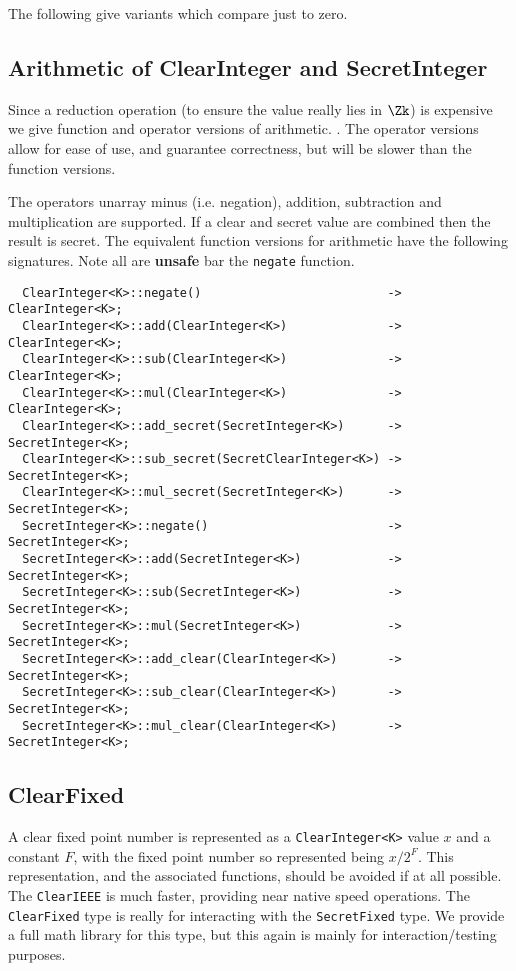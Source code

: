\noindent
The following give variants which compare just to zero.

\subsection{Arithmetic of ClearInteger and SecretInteger}
Since a reduction operation (to ensure the value really lies in
$\Zk$) is expensive we give function and operator versions of arithmetic.
.
The operator versions allow for ease of use, and guarantee correctness,
but will be slower than the function versions.

The operators unarray minus (i.e. negation), addition, subtraction
and multiplication are supported. If a clear and secret value are
combined then the result is secret.
The equivalent function versions for arithmetic have the following signatures.
Note all are {\bf unsafe} bar the \verb|negate| function.
\begin{lstlisting}
  ClearInteger<K>::negate()                          -> ClearInteger<K>;
  ClearInteger<K>::add(ClearInteger<K>)              -> ClearInteger<K>;
  ClearInteger<K>::sub(ClearInteger<K>)              -> ClearInteger<K>;
  ClearInteger<K>::mul(ClearInteger<K>)              -> ClearInteger<K>;
  ClearInteger<K>::add_secret(SecretInteger<K>)      -> SecretInteger<K>;
  ClearInteger<K>::sub_secret(SecretClearInteger<K>) -> SecretInteger<K>;
  ClearInteger<K>::mul_secret(SecretInteger<K>)      -> SecretInteger<K>;
  SecretInteger<K>::negate()                         -> SecretInteger<K>;
  SecretInteger<K>::add(SecretInteger<K>)            -> SecretInteger<K>;
  SecretInteger<K>::sub(SecretInteger<K>)            -> SecretInteger<K>;
  SecretInteger<K>::mul(SecretInteger<K>)            -> SecretInteger<K>;
  SecretInteger<K>::add_clear(ClearInteger<K>)       -> SecretInteger<K>;
  SecretInteger<K>::sub_clear(ClearInteger<K>)       -> SecretInteger<K>;
  SecretInteger<K>::mul_clear(ClearInteger<K>)       -> SecretInteger<K>;
\end{lstlisting}




\subsection{ClearFixed}
A clear fixed point number is represented as a \verb|ClearInteger<K>| value $x$ and
a constant $F$, with the fixed point number so represented being $x/2^F$.
This representation, and the associated functions, should be avoided
if at all possible. The \verb|ClearIEEE| is much faster, providing
near native speed operations. 
The \verb|ClearFixed| type is really for interacting with the
\verb|SecretFixed| type. We provide a full math library for this type, 
but this again is mainly for interaction/testing purposes.

